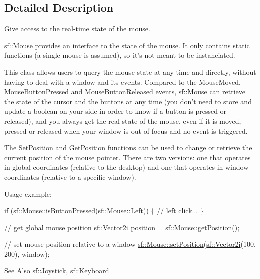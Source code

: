 \subsection{Detailed Description}
Give access to the real-\/time state of the mouse. 

\hyperlink{classsf_1_1_mouse}{sf\-::\-Mouse} provides an interface to the state of the mouse. It only contains static functions (a single mouse is assumed), so it's not meant to be instanciated.

This class allows users to query the mouse state at any time and directly, without having to deal with a window and its events. Compared to the Mouse\-Moved, Mouse\-Button\-Pressed and Mouse\-Button\-Released events, \hyperlink{classsf_1_1_mouse}{sf\-::\-Mouse} can retrieve the state of the cursor and the buttons at any time (you don't need to store and update a boolean on your side in order to know if a button is pressed or released), and you always get the real state of the mouse, even if it is moved, pressed or released when your window is out of focus and no event is triggered.

The Set\-Position and Get\-Position functions can be used to change or retrieve the current position of the mouse pointer. There are two versions\-: one that operates in global coordinates (relative to the desktop) and one that operates in window coordinates (relative to a specific window).

Usage example\-: 
\begin{DoxyCode}
\textcolor{keywordflow}{if} (\hyperlink{classsf_1_1_mouse_ab647159eb88e369a0332a9c5a7ba6687}{sf::Mouse::isButtonPressed}(\hyperlink{classsf_1_1_mouse_a4fb128be433f9aafe66bc0c605daaa90a8bb4856e1ec7f6b6a8605effdfc0eee8}{sf::Mouse::Left}))
\{
    \textcolor{comment}{// left click...}
\}

\textcolor{comment}{// get global mouse position}
\hyperlink{classsf_1_1_vector2}{sf::Vector2i} position = \hyperlink{classsf_1_1_mouse_ac368680f797b7f6e4f50b5b7928c1387}{sf::Mouse::getPosition}();

\textcolor{comment}{// set mouse position relative to a window}
\hyperlink{classsf_1_1_mouse_a1222e16c583be9e3d176d86e0b7817d7}{sf::Mouse::setPosition}(\hyperlink{classsf_1_1_vector2}{sf::Vector2i}(100, 200), window);
\end{DoxyCode}


\begin{DoxySeeAlso}{See Also}
\hyperlink{classsf_1_1_joystick}{sf\-::\-Joystick}, \hyperlink{classsf_1_1_keyboard}{sf\-::\-Keyboard} 
\end{DoxySeeAlso}


